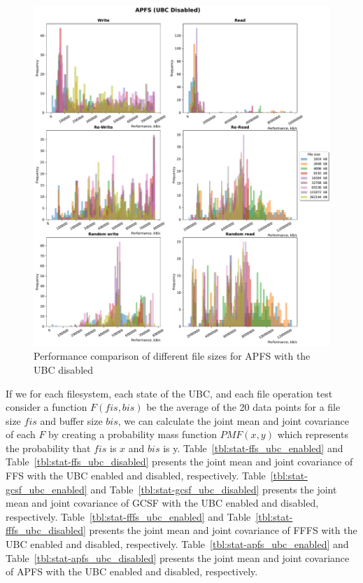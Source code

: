 \begin{figure}[!htb]
	\label{fig:bench_apfs_without_cache}
	\begin{center}
		\includegraphics[width=1.0\textwidth]{figures.nosync/benchmarking/APFS/APFS-UBC Disabled-hist.pdf}
	\end{center}
	\caption{Performance comparison of different file sizes for APFS with the UBC disabled}
\end{figure}

\FloatBarrier

If we for each filesystem, each state of the \gls{UBC}, and each file operation test consider a function $F(fis, bis)$ be the average of the 20 data points for a file size $fis$ and buffer size $bis$, we can calculate the joint mean and joint covariance of each $F$ by creating a probability mass function $PMF(x, y)$ which represents the probability that $fis$ is $x$ and $bis$ is y. Table~\ref{tbl:stat-ffs_ubc_enabled} and Table~\ref{tbl:stat-ffs_ubc_disabled} presents the joint mean and joint covariance of \gls{FFS} with the \gls{UBC} enabled and disabled, respectively. Table~\ref{tbl:stat-gcsf_ubc_enabled} and Table~\ref{tbl:stat-gcsf_ubc_disabled} presents the joint mean and joint covariance of \gls{GCSF} with the \gls{UBC} enabled and disabled, respectively. Table~\ref{tbl:stat-fffs_ubc_enabled} and Table~\ref{tbl:stat-fffs_ubc_disabled} presents the joint mean and joint covariance of \gls{FFFS} with the \gls{UBC} enabled and disabled, respectively. Table~\ref{tbl:stat-apfs_ubc_enabled} and Table~\ref{tbl:stat-apfs_ubc_disabled} presents the joint mean and joint covariance of \gls{APFS} with the \gls{UBC} enabled and disabled, respectively.


